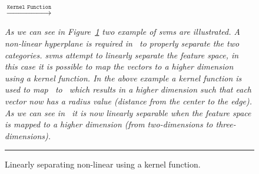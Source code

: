 \begin{figure}[t!]
  \centering
  $\xrightarrow{\texttt{Kernel Function}}$
  \caption{Linearly separating non-linear using a kernel function.}
  \vspace{1mm}
  \footnotesize{\emph{As we can see in Figure~\ref{fig:SVM_non-linear_kernel} two example of \gls{svm}s are illustrated. A non-linear hyperplane is required in~ to properly separate the two categories. \gls{svm}s attempt to linearly separate the feature space, in this case it is possible to map the vectors to a higher dimension using a \emph{kernel function}. In the above example a kernel function is used to map~ to~ which results in a higher dimension such that each vector now has a radius value (distance from the center to the edge). As we can see in~ it is now linearly separable when the feature space is mapped to a higher dimension (from two-dimensions to three-dimensions).}}
  \vspace{2mm}
  \hrule
  \label{fig:SVM_non-linear_kernel}
\end{figure}

